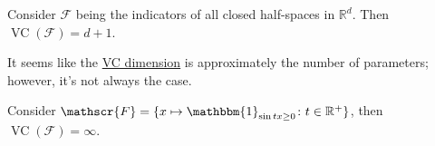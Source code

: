 \begin{eg}
	Consider \(\mathscr{F} \) being the indicators of all closed half-spaces in \(\mathbb{R} ^d\). Then \(\mathop{\mathrm{VC}}(\mathscr{F} ) = d+1 \).
\end{eg}

It seems like the \hyperref[def:VC-dimension]{VC dimension} is approximately the number of parameters; however, it's not always the case.

\begin{eg}
	Consider \(\mathscr{F} = \{ x \mapsto \mathbbm{1}_{\sin tx \geq 0} \colon t \in \mathbb{R} ^+\} \), then \(\mathop{\mathrm{VC}}(\mathscr{F} ) = \infty \).
\end{eg}